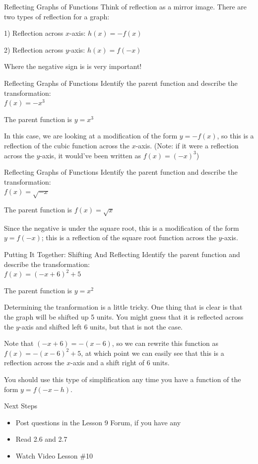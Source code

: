 \documentclass{beamer}
\begin{document}
\begin{frame}[t]{Reflecting Graphs of Functions}
Think of reflection as a mirror image. There are two types of reflection for a graph:

\pause

1) Reflection across $x$-axis: $h(x) = -f(x)$

2) Reflection across $y$-axis: $h(x) = f(-x)$

\pause

Where the negative sign is is very important!
\end{frame}

\begin{frame}[t]{Reflecting Graphs of Functions}
Identify the parent function and describe the transformation: \\
$f(x) = -x^3$

\pause

The parent function is $y = x^3$

\pause

In this case, we are looking at a modification of the form $y = -f(x)$, so this is a reflection of the cubic function across the $x$-axis. (Note: if it were a reflection across the $y$-axis, it would've been written as $f(x) = (-x)^3$)
\end{frame}

\begin{frame}[t]{Reflecting Graphs of Functions}
Identify the parent function and describe the transformation: \\
$f(x) = \sqrt{-x}$

\pause

The parent function is $f(x) = \sqrt{x}$

Since the negative is under the square root, this is a modification of the form $y = f(-x)$; this is a reflection of the square root function across the $y$-axis.
\end{frame}

\begin{frame}[t]{Putting It Together: Shifting And Reflecting}
Identify the parent function and describe the transformation: \\
$f(x) = (-x + 6)^2 + 5$

\pause

The parent function is $y = x^2$

\pause Determining the tranformation is a little tricky. One thing that is clear is that the graph will be shifted up 5 units. You might guess that it is reflected across the $y$-axis and shifted left 6 units, but that is not the case.

\pause

Note that $(-x+6) = -(x - 6)$, so we can rewrite this function as $f(x) = -(x-6)^2 + 5$, at which point we can easily see that this is a reflection across the $x$-axis and a shift right of 6 units.

\pause

You should use this type of simplification any time you have a function of the form $y = f(-x - h)$.
\end{frame}

\begin{frame}[t]{Next Steps}
\begin{itemize}
\item Post questions in the Lesson 9 Forum, if you have any
\item Read 2.6 and 2.7
\item Watch Video Lesson \#10
\end{itemize}
\end{frame}
\end{document}
